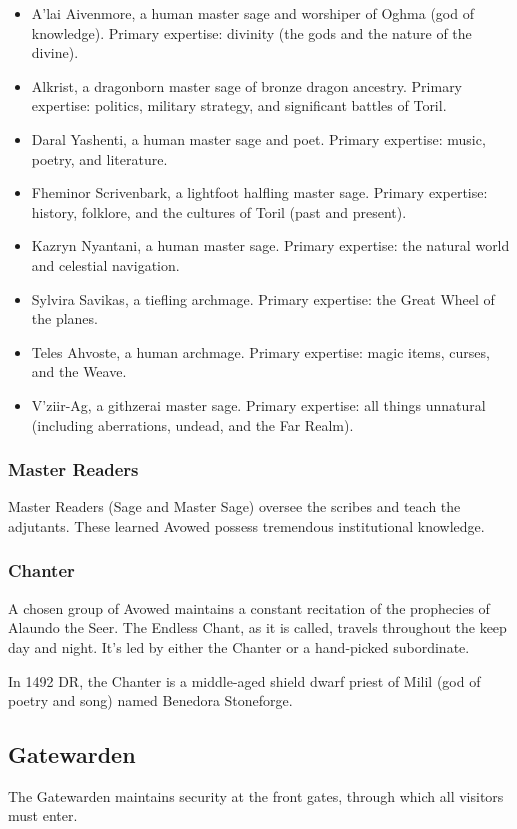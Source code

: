 \documentclass[10pt,a4paper,twoside,bg=print,twocolumn,openany,nodeprecatedcode]{dndbook}
\begin{document}
\begin{itemize}
\item A'lai Aivenmore, a human master sage and worshiper of Oghma (god of knowledge). Primary expertise: divinity (the gods and the nature of the divine).
\item Alkrist, a dragonborn master sage of bronze dragon ancestry. Primary expertise: politics, military strategy, and significant battles of Toril.
\item Daral Yashenti, a human master sage and poet. Primary expertise: music, poetry, and literature.
\item Fheminor Scrivenbark, a lightfoot halfling master sage. Primary expertise: history, folklore, and the cultures of Toril (past and present).
\item Kazryn Nyantani, a human master sage. Primary expertise: the natural world and celestial navigation.
\item Sylvira Savikas, a tiefling archmage. Primary expertise: the Great Wheel of the planes.
\item Teles Ahvoste, a human archmage. Primary expertise: magic items, curses, and the Weave.
\item V'ziir-Ag, a githzerai master sage. Primary expertise: all things unnatural (including aberrations, undead, and the Far Realm).
\end{itemize}

\subsubsection{Master Readers}
Master Readers (Sage and Master Sage) oversee the scribes and teach the adjutants. These learned Avowed possess tremendous institutional knowledge.

\subsubsection{Chanter}
A chosen group of Avowed maintains a constant recitation of the prophecies of Alaundo the Seer. The Endless Chant, as it is called, travels throughout the keep day and night. It's led by either the Chanter or a hand-picked subordinate.

In 1492 DR, the Chanter is a middle-aged shield dwarf priest of Milil (god of poetry and song) named Benedora Stoneforge.

\subsection{Gatewarden}
The Gatewarden maintains security at the front gates, through which all visitors must enter.
\end{document}
